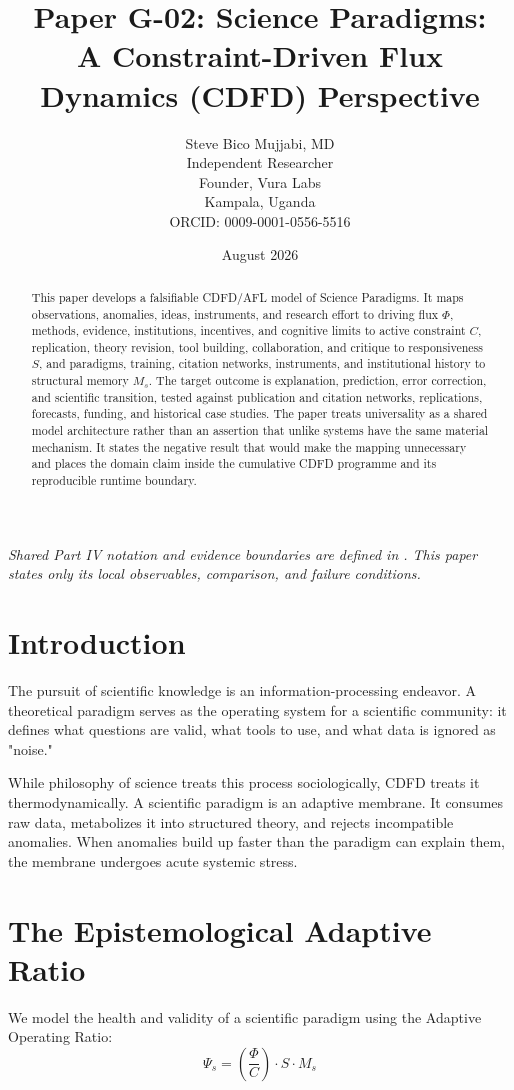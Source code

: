 \documentclass[11pt,a4paper]{article}
\title{\textbf{Paper G-02: Science Paradigms:\\ A Constraint-Driven Flux Dynamics (CDFD) Perspective}}
\author{Steve Bico Mujjabi, MD\\
\small Independent Researcher\\
\small Founder, Vura Labs\\
\small Kampala, Uganda\\
\small ORCID: 0009-0001-0556-5516}
\date{August 2026}
\begin{document}
\maketitle

\noindent\textit{Shared Part IV notation and evidence boundaries are defined in . This paper states only its local observables, comparison, and failure conditions.}


\begin{abstract}
This paper develops a falsifiable CDFD/AFL model of Science Paradigms. It maps observations, anomalies, ideas, instruments, and research effort to driving flux $\Phi$, methods, evidence, institutions, incentives, and cognitive limits to active constraint $C$, replication, theory revision, tool building, collaboration, and critique to responsiveness $S$, and paradigms, training, citation networks, instruments, and institutional history to structural memory $M_s$. The target outcome is explanation, prediction, error correction, and scientific transition, tested against publication and citation networks, replications, forecasts, funding, and historical case studies. The paper treats universality as a shared model architecture rather than an assertion that unlike systems have the same material mechanism. It states the negative result that would make the mapping unnecessary and places the domain claim inside the cumulative CDFD programme and its reproducible runtime boundary.
\end{abstract}

\section{Introduction}

The pursuit of scientific knowledge is an information-processing endeavor. A theoretical paradigm serves as the operating system for a scientific community: it defines what questions are valid, what tools to use, and what data is ignored as "noise."

While philosophy of science treats this process sociologically, CDFD treats it thermodynamically. A scientific paradigm is an adaptive membrane. It consumes raw data, metabolizes it into structured theory, and rejects incompatible anomalies. When anomalies build up faster than the paradigm can explain them, the membrane undergoes acute systemic stress.

\section{The Epistemological Adaptive Ratio}
We model the health and validity of a scientific paradigm using the Adaptive Operating Ratio:
\begin{equation}
    \Psi_s = \left( \frac{\Phi}{C} \right) \cdot S \cdot M_s
\end{equation}
\end{document}
